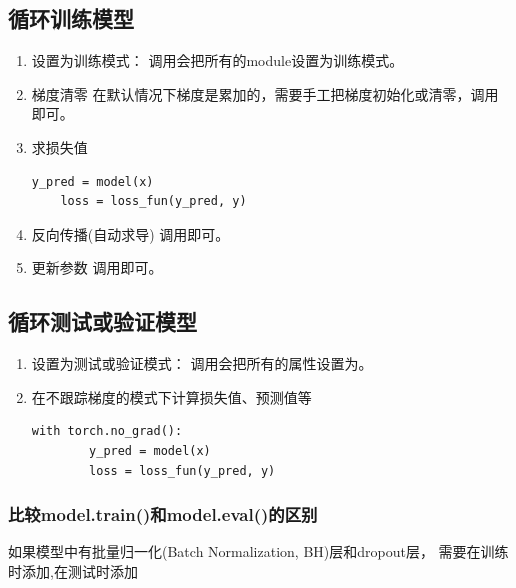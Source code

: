 \subsection{循环训练模型}
\label{subsubsec:Pytorch_loop_train_model}
\begin{enumerate}[label=\arabic*)]
    \item 设置为训练模式：
    调用会把所有的module设置为训练模式。

    \item 梯度清零
    在默认情况下梯度是累加的，需要手工把梯度初始化或清零，调用即可。

    \item 求损失值
    \begin{lstlisting}[style=demostyle,numbers=none]
    y_pred = model(x)
    loss = loss_fun(y_pred, y)
    \end{lstlisting}

    \item 反向传播(自动求导)
    调用即可。

    \item 更新参数
    调用即可。
\end{enumerate}




\subsection{循环测试或验证模型}
\label{subsubsec:Pytorch_loop_test_or_validate_model}
\begin{enumerate}[label=\arabic*)]
    \item 设置为测试或验证模式：
    调用会把所有的属性设置为。

    \item 在不跟踪梯度的模式下计算损失值、预测值等
    \begin{lstlisting}[style=demostyle,numbers=none]
    with torch.no_grad():
        y_pred = model(x)
        loss = loss_fun(y_pred, y)
    \end{lstlisting}
\end{enumerate}

\subsubsection{比较model.train()和model.eval()的区别}
\label{subsubsubsec:Pytorch_compare_model_train_and_eval}
如果模型中有批量归一化(Batch Normalization, BH)层和dropout层，
需要在训练时添加,在测试时添加

